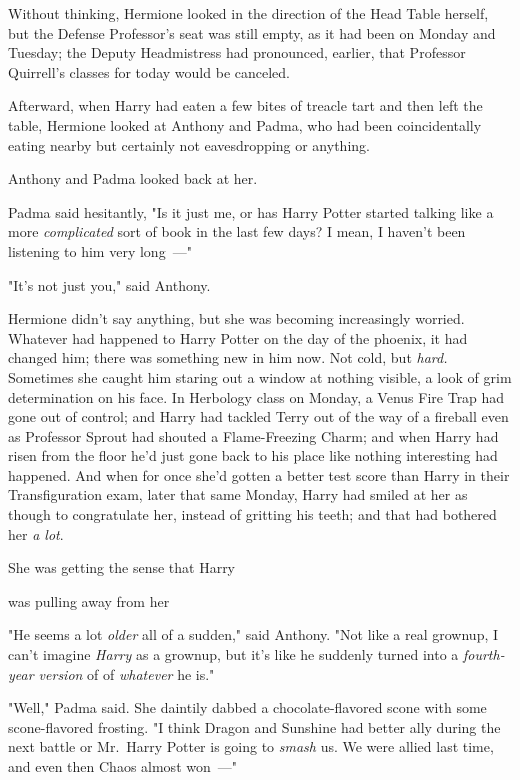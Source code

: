 Without thinking, Hermione looked in the direction of the Head Table herself,
but the Defense Professor's seat was still empty, as it had been on Monday and
Tuesday; the Deputy Headmistress had pronounced, earlier, that Professor
Quirrell's classes for today would be canceled.

Afterward, when Harry had eaten a few bites of treacle tart and then left the
table, Hermione looked at Anthony and Padma, who had been coincidentally eating
nearby but certainly not eavesdropping or anything.

Anthony and Padma looked back at her.

Padma said hesitantly, "Is it just me, or has Harry Potter started talking like
a more \emph{complicated} sort of book in the last few days? I mean, I haven't
been listening to him very long~---"

"It's not just you," said Anthony.

Hermione didn't say anything, but she was becoming increasingly worried.
Whatever had happened to Harry Potter on the day of the phoenix, it had changed
him; there was something new in him now. Not cold, but \emph{hard.} Sometimes
she caught him staring out a window at nothing visible, a look of grim
determination on his face. In Herbology class on Monday, a Venus Fire Trap had
gone out of control; and Harry had tackled Terry out of the way of a fireball
even as Professor Sprout had shouted a Flame-Freezing Charm; and when Harry had
risen from the floor he'd just gone back to his place like nothing interesting
had happened. And when for once she'd gotten a better test score than Harry in
their Transfiguration exam, later that same Monday, Harry had smiled at her as
though to congratulate her, instead of gritting his teeth; and{\el} that had
bothered her \emph{a lot}.

She was getting the sense that Harry{\el}

{\el} was pulling away from her{\el}

"He seems a lot \emph{older} all of a sudden," said Anthony. "Not like a real
grownup, I can't imagine \emph{Harry} as a grownup, but it's like he suddenly
turned into a \emph{fourth-year version} of{\el} of \emph{whatever} he is."

"Well," Padma said. She daintily dabbed a chocolate-flavored scone with some
scone-flavored frosting. "I think Dragon and Sunshine had better ally during
the next battle or Mr.~Harry Potter is going to \emph{smash} us. We were allied
last time, and even then Chaos almost won~---"


